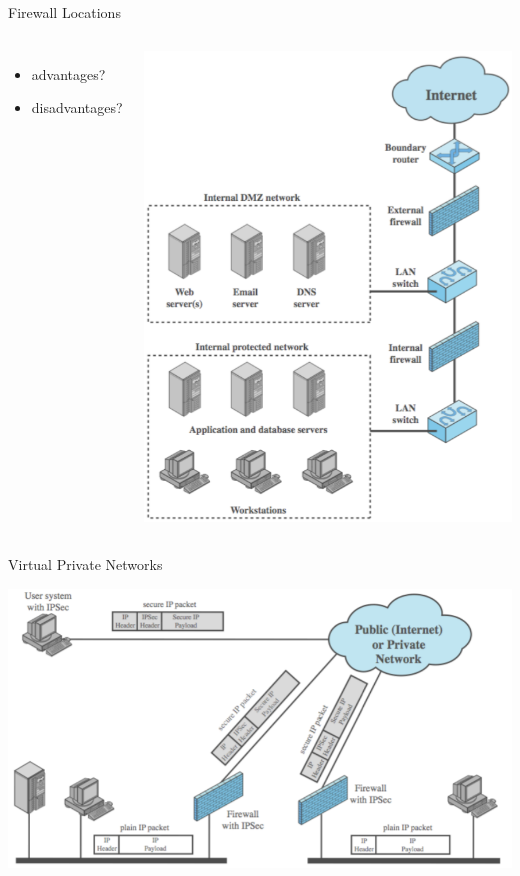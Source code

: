 \documentclass{beamer}
\begin{document}
\begin{frame}{Firewall Locations}
  \begin{columns}[c]
     {
    \begin{itemize}
    \item advantages?
    \item disadvantages?
    \end{itemize}
    }
    \includegraphics[width=1\linewidth]{firewall-location}
  \end{columns}
\end{frame}

\begin{frame}{Virtual Private Networks}
  \begin{center}
    \includegraphics[width=1\linewidth]{vpn}
  \end{center}
\end{frame}
\end{document}
